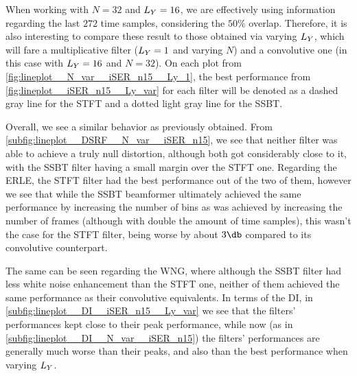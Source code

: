 When working with $N = 32$ and $\Ly = 16$, we are effectively using information regarding the last $272$ time samples, considering the $50\%$ overlap. Therefore, it is also interesting to compare these result to those obtained via varying $\Ly$, which will fare a multiplicative filter ($\Ly = 1$ and varying $N$) and a convolutive one (in this case with $\Ly = 16$ and $N = 32$). On each plot from \cref{fig:lineplot__N_var__iSER_n15__Ly_1}, the best performance from \cref{fig:lineplot__iSER_n15__Ly_var} for each filter will be denoted as a dashed gray line for the STFT and a dotted light gray line for the SSBT.

Overall, we see a similar behavior as previously obtained. From \cref{subfig:lineplot__DSRF__N_var__iSER_n15}, we see that neither filter was able to achieve a truly null distortion, although both got considerably close to it, with the SSBT filter having a small margin over the STFT one. Regarding the ERLE, the STFT filter had the best performance out of the two of them, however we see that while the SSBT beamformer ultimately achieved the same performance by increasing the number of bins as was achieved by increasing the number of frames (although with double the amount of time samples), this wasn't the case for the STFT filter, being worse by about $3\dB$ compared to its convolutive counterpart.

The same can be seen regarding the WNG, where although the SSBT filter had less white noise enhancement than the STFT one, neither of them achieved the same performance as their convolutive equivalents. In terms of the DI, in \cref{subfig:lineplot__DI__iSER_n15__Ly_var} we see that the filters' performances kept close to their peak performance, while now (as in \cref{subfig:lineplot__DI__N_var__iSER_n15}) the filters' performances are generally much worse than their peaks, and also than the best performance when varying $\Ly$.


